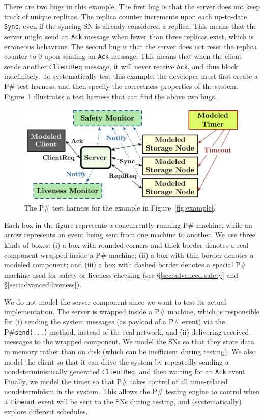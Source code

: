 \documentclass{llncs}
\newcommand{\ps}{P\#\xspace}
\begin{document}
There are two bugs in this example. The first bug is that the server does not keep track of unique replicas. The replica counter increments upon each up-to-date \texttt{Sync}, even if the syncing SN is already considered a replica. This means that the server might send an \texttt{Ack} message when fewer than three replicas exist, which is erroneous behaviour. The second bug is that the server does not reset the replica counter to 0 upon sending an \texttt{Ack} message. This means that when the client sends another \texttt{ClientReq} message, it will never receive \texttt{Ack}, and thus block indefinitely. To systematically test this example, the developer must first create a \ps test harness, and then specify the correctness properties of the system. Figure~\ref{fig:example:model} illustrates a test harness that can find the above two bugs.

\begin{figure}[t]
\centering
\includegraphics[width=.7\linewidth]{figures/example}
\caption[The \ps test harness for the example in Figure~\ref{fig:example}]{The \ps test harness for the example in Figure~\ref{fig:example}.}
\label{fig:example:model}
\end{figure}

Each box in the figure represents a concurrently running \ps machine, while an arrow represents an event being sent from one machine to another. We use three kinds of boxes: (i) a box with rounded corners and thick border denotes a real component wrapped inside a \ps machine; (ii) a box with thin border denotes a modeled component; and (iii) a box with dashed border denotes a special \ps machine used for safety or liveness checking (see \S\ref{sec:advanced:safety} and \S\ref{sec:advanced:liveness}).

We do not model the server component since we want to test its actual implementation. The server is wrapped inside a \ps machine, which is responsible for (i) sending the system messages (as payload of a \ps event) via the \ps \texttt{send(...)} method, instead of the real network, and (ii) delivering received messages to the wrapped component. We model the SNs so that they store data in memory rather than on disk (which can be inefficient during testing). We also model the client so that it can drive the system by repeatedly sending a nondeterministically generated \texttt{ClientReq}, and then waiting for an \texttt{Ack} event. Finally, we model the timer so that \ps takes control of all time-related nondeterminism in the system. This allows the \ps testing engine to control when a \texttt{Timeout} event will be sent to the SNs during testing, and (systematically) explore different schedules.
\end{document}
